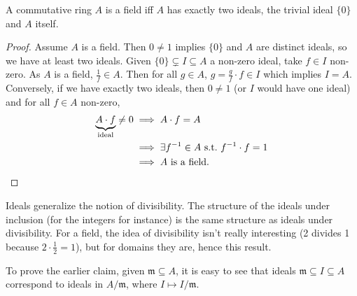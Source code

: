 \begin{lemma}
    A commutative ring $A$ is a field iff $A$ has exactly two ideals, the trivial ideal $\{0\} $ and $A$ itself.
\end{lemma}
\begin{proof}
    Assume $A$ is a field. Then $0\neq 1$ implies $\{0\}$ and $A$ are distinct ideals, so we have at least two ideals. Given $\{0 \} \subsetneq I \subseteq A$ a non-zero ideal, take $f \in I$ non-zero. As $A$ is a field, $\frac{1}{f} \in A$. Then for all $g \in A$, $g = \frac{g}{f}\cdot f \in I$ which implies $I=A$. 
    Conversely, if we have exactly two ideals, then $0\neq 1$ (or $I$ would have one ideal) and for all $f \in A$ non-zero,
    \begin{align*}
        \underset{\text{ideal} }{\underbrace{A \cdot f} } \neq 0 & \implies A \cdot f=A\\
                                                                 & \implies \exists f ^{-1} \in A \ \text{s.t.} \ f^{-1} \cdot f=1\\
                                                                 &\implies A \ \text{is a field.} \qedhere
    \end{align*}
\end{proof}
Ideals generalize the notion of divisibility. The structure of the ideals under inclusion (for the integers for instance) is the same structure as ideals under divisibility. For a field, the idea of divisibility isn't really interesting (2 divides 1 because $2\cdot \frac{1}{2}=1$), but for domains they are, hence this result.

   To prove the earlier claim, given $\mathfrak m \subseteq A$, it is easy to see that ideals $\mathfrak m \subseteq  I \subseteq A$ correspond to ideals in $A / \mathfrak m$, where $I \mapsto I / \mathfrak m$. 


